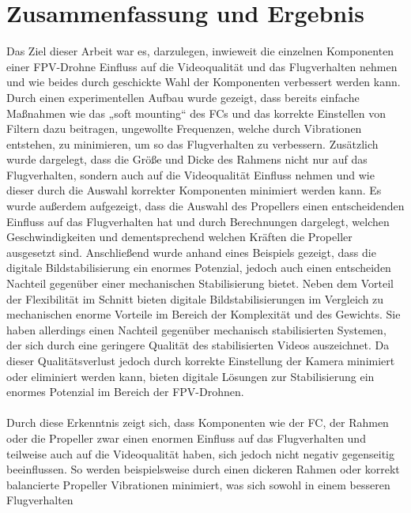 
\section[Zusammenfassung und Ergebnis]{Zusammenfassung und Ergebnis}
    Das Ziel dieser Arbeit war es, darzulegen, inwieweit die einzelnen Komponenten einer FPV-Drohne
    Einfluss auf die Videoqualität und das Flugverhalten nehmen und wie beides durch geschickte Wahl
    der Komponenten verbessert werden kann. Durch einen experimentellen Aufbau wurde gezeigt, dass
    bereits einfache Maßnahmen wie das „soft mounting“ des FCs und das korrekte Einstellen von Filtern
    dazu beitragen, ungewollte Frequenzen, welche durch Vibrationen entstehen, zu minimieren, um so
    das Flugverhalten zu verbessern. Zusätzlich wurde dargelegt, dass die Größe und Dicke des Rahmens
    nicht nur auf das Flugverhalten, sondern auch auf die Videoqualität Einfluss nehmen und wie dieser
    durch die Auswahl korrekter Komponenten minimiert werden kann. Es wurde außerdem aufgezeigt, dass
    die Auswahl des Propellers einen entscheidenden Einfluss auf das Flugverhalten hat und durch
    Berechnungen dargelegt, welchen Geschwindigkeiten und dementsprechend welchen Kräften die Propeller
    ausgesetzt sind. Anschließend wurde anhand eines Beispiels gezeigt, dass die digitale
    Bildstabilisierung ein enormes Potenzial, jedoch auch einen entscheiden Nachteil gegenüber einer
    mechanischen Stabilisierung bietet. Neben dem Vorteil der Flexibilität im Schnitt bieten digitale
    Bildstabilisierungen im Vergleich zu mechanischen enorme Vorteile im Bereich der Komplexität und
    des Gewichts. Sie haben allerdings einen Nachteil gegenüber mechanisch stabilisierten Systemen,
    der sich durch eine geringere Qualität des stabilisierten Videos auszeichnet. Da dieser Qualitätsverlust
    jedoch durch korrekte Einstellung der Kamera minimiert oder eliminiert werden kann, bieten digitale
    Lösungen zur Stabilisierung ein enormes Potenzial im Bereich der FPV-Drohnen. \\
    \\
    Durch diese Erkenntnis zeigt sich, dass Komponenten wie der FC, der Rahmen oder die Propeller zwar
    einen enormen Einfluss auf das Flugverhalten und teilweise auch auf die Videoqualität haben, sich
    jedoch nicht negativ gegenseitig beeinflussen. So werden beispielsweise durch einen dickeren Rahmen
    oder korrekt balancierte Propeller Vibrationen minimiert, was sich sowohl in einem besseren Flugverhalten
